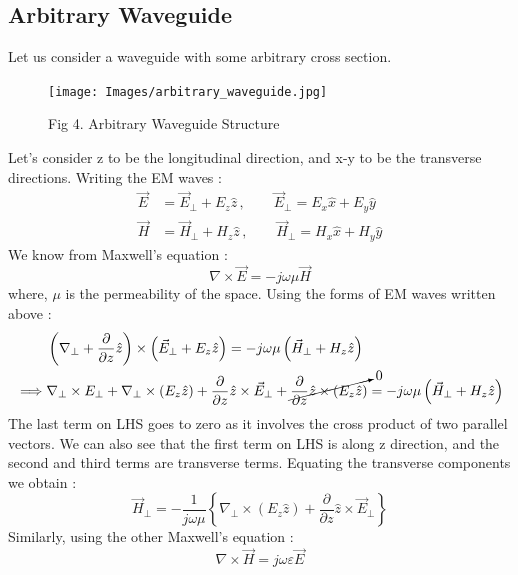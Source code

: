 \documentclass[12pt]{article}
\begin{document}
\subsection{Arbitrary Waveguide}
Let us consider a waveguide with some arbitrary cross section.
\begin{figure}[H]
  \centering
  \texttt{[image: Images/arbitrary\_waveguide.jpg]}
  \caption{Fig 4. Arbitrary Waveguide Structure}
\end{figure}
Let's consider z to be the longitudinal direction, and x-y to be the transverse directions. Writing the EM waves :
\begin{align*}
  \vec{E}&=\vec{E}_{\perp}+E_z \hat{z} \, , \qquad \vec{E}_{\perp}=E_x \hat{x}+E_y \hat{y} \\
  \vec{H}&= \vec{H}_{\perp} + H_z \hat{z} \, , \qquad \vec{H}_{\perp} = H_x \hat{x}+H_y \hat{y} 
\end{align*}
We know from Maxwell's equation :
\begin{equation}
  \nabla \times \vec{E} = -j\omega \mu \vec{H} \label{eq:2}
\end{equation}
where, $\mu$ is the permeability of the space. \linebreak
Using the forms of EM waves written above :
\begin{align*}
  & \left( \nabla_{\perp}+\dfrac{\partial}{\partial z} \hat{z} \right) \times \left( \vec{E}_{\perp}+E_z \hat{z} \right) = -j\omega \mu \left( \vec{H}_{\perp}+ H_z \hat{z} \right) \\
  \implies & \nabla_{\perp} \times E_{\perp} + \nabla_{\perp}\times \left( E_z \hat{z} \right) +\dfrac{\partial}{\partial z}\hat{z}\times \vec{E}_{\perp} + \cancelto{0}{\dfrac{\partial}{\partial z} \hat{z}\times \left( E_z \hat{z}\right)} = -j\omega \mu \left( \vec{H}_{\perp}+H_z \hat{z}\right)
\end{align*}
The last term on LHS goes to zero as it involves the cross product of two parallel vectors. \linebreak
We can also see that the first term on LHS is along z direction, and the second and third terms are transverse terms. Equating the transverse components we obtain :
\begin{equation}
  \vec{H}_{\perp}=-\dfrac{1}{j\omega \mu} \left\{ \nabla_{\perp} \times \left( E_z \hat{z} \right) + \dfrac{\partial}{\partial z} \hat{z}\times \vec{E}_{\perp} \right\} \label{eq:3}
\end{equation}
Similarly, using the other Maxwell's equation :
\begin{equation}
  \nabla \times \vec{H} = j\omega \varepsilon \vec{E} \label{eq:4}
\end{equation}
\end{document}
